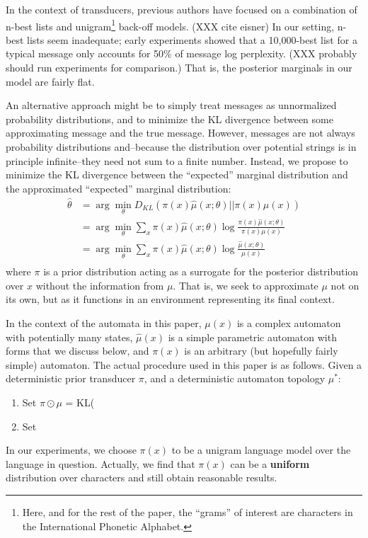 \documentclass[11pt,a4paper]{article}
\begin{document}
In the context of transducers, previous authors have focused on a
combination of n-best lists and unigram\footnote{Here, and for the
rest of the paper, the ``grams'' of interest are characters in the
International Phonetic Alphabet.} back-off models. (XXX cite eisner)
In our setting, n-best lists seem inadequate; early experiments
showed that a 10,000-best list for a typical message only accounts
for 50\% of message log perplexity. (XXX probably should run
experiments for comparison.) That is, the posterior marginals in
our model are fairly flat.

An alternative approach might be to simply treat messages as
unnormalized probability distributions, and to minimize the KL
divergence between some approximating message and the true message.
However, messages are not always probability distributions and--because
the distribution over potential strings is in principle infinite--they
need not sum to a finite number. Instead, we propose to minimize
the KL divergence between the ``expected'' marginal distribution
and the approximated ``expected'' marginal distribution:
\begin{equation}
  \begin{split}
    \hat\theta &= \arg\!\min_{\theta} D_{KL}(\pi(x)\hat\mu(x;\theta)||\pi(x)\mu(x) ) \\
    &= \arg\!\min_{\theta} \sum_x \pi(x) \hat\mu(x;\theta) \log \frac{\pi(x)\hat\mu(x;\theta)}{\pi(x)\mu(x)} \\
    &= \arg\!\min_{\theta} \sum_x \pi(x) \hat\mu(x;\theta) \log \frac{\hat\mu(x;\theta)}{\mu(x)} \\
   \end{split}
 \end{equation}
where $\pi$ is a prior distribution acting as a surrogate for the posterior
distribution over $x$ without the information from $\mu$. That is, we 
seek to approximate $\mu$ not on its own, but as it functions in
an environment representing its final context. 

In the context of the automata in this paper, $\mu(x)$ is a complex
automaton with potentially many states, $\hat\mu(x)$ is a simple
parametric automaton with forms that we discuss below, and $\pi(x)$
is an arbitrary (but hopefully fairly simple) automaton.
The actual procedure used in this paper is as follows. Given a
deterministic prior transducer $\pi$, and a deterministic automaton
topology $\mu^*$:
\begin{enumerate}
  \item Set $\pi\odot\mu$ = KL(
  \item Set 
\end{enumerate} 
In our experiments, we choose $\pi(x)$ to be a unigram language
model over the language in question.  Actually, we find that $\pi(x)$
can be a \textbf{uniform} distribution over characters and still
obtain reasonable results.
\end{document}
